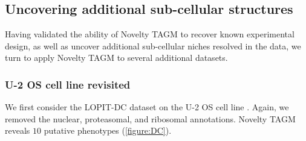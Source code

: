 \documentclass[12pt,english]{article}
\begin{document}
\subsection{Uncovering additional sub-cellular structures}
Having validated the ability of Novelty TAGM to recover known experimental design, as well as uncover additional sub-cellular niches resolved in the data, we turn to apply Novelty TAGM to several additional datasets.

\subsubsection{U-2 OS cell line revisited}
 We first consider the LOPIT-DC dataset on the U-2 OS cell line \citep{DC:2018}. Again, we removed the nuclear, proteasomal, and ribosomal annotations. Novelty TAGM reveals $10$ putative phenotypes (\ref{figure:DC}).
\end{document}
